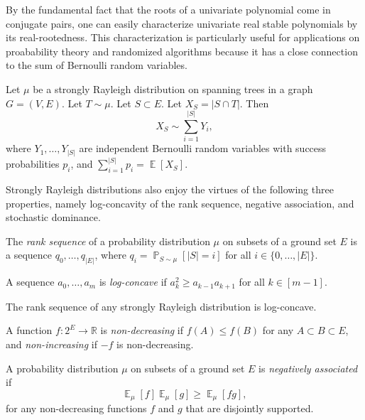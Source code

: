 \documentclass[letterpaper, reqno,12pt]{article}
\newcommand{\RR}{\mathbb{R}}
\newcommand{\PP}{\mathop{{}\mathbb{P}}}
\newcommand{\EE}{\mathop{{}\mathbb{E}}}
\begin{document}
By the fundamental fact that the roots of a univariate polynomial come in conjugate pairs, one can easily characterize univariate real stable polynomials by its real-rootedness. This characterization is particularly useful for applications on proabability theory and randomized algorithms because it has a close connection to the sum of Bernoulli random variables.

\begin{theorem} \label{thm:sum-of-bernoulli}
  Let $\mu$ be a strongly Rayleigh distribution on spanning trees in a graph $G = (V, E)$. Let $T \sim \mu$. Let $S \subset E$. Let $X_S = |S \cap T|$. Then
  $$ X_S \sim \sum_{i = 1}^{|S|} Y_i, $$
  where $Y_1, \ldots, Y_{|S|}$ are independent Bernoulli random variables with success probabilities $p_i$, and $\sum_{i = 1}^{|S|} p_i = \EE[X_S]$.
\end{theorem}

Strongly Rayleigh distributions also enjoy the virtues of the following three properties, namely log-concavity of the rank sequence, negative association, and stochastic dominance.

\begin{definition}
  The \emph{rank sequence} of a probability distribution $\mu$ on subsets of a ground set $E$ is a sequence $q_0, \ldots, q_{|E|}$, where $q_i = \PP_{S \sim \mu}[|S| = i]$ for all $i \in \{ 0, \ldots, |E| \}$.
\end{definition}

\begin{definition}
  A sequence $a_0, \ldots, a_m$ is \emph{log-concave} if $a_k^2 \geq a_{k - 1} a_{k + 1}$ for all $k \in [m - 1]$.
\end{definition}

\begin{theorem} \label{thm:log-concave}
  The rank sequence of any strongly Rayleigh distribution is log-concave.
\end{theorem}

\begin{definition}
  A function $f : 2^E \to \RR$ is \emph{non-decreasing} if $f(A) \leq f(B)$ for any $A \subset B \subset E$, and \emph{non-increasing} if $-f$ is non-decreasing.
\end{definition}

\begin{definition}
  A probability distribution $\mu$ on subsets of a ground set $E$ is \emph{negatively associated} if
  $$ \EE_\mu[f] \EE_\mu[g] \geq \EE_\mu[fg], $$
  for any non-decreasing functions $f$ and $g$ that are disjointly supported.
\end{definition}
\end{document}

